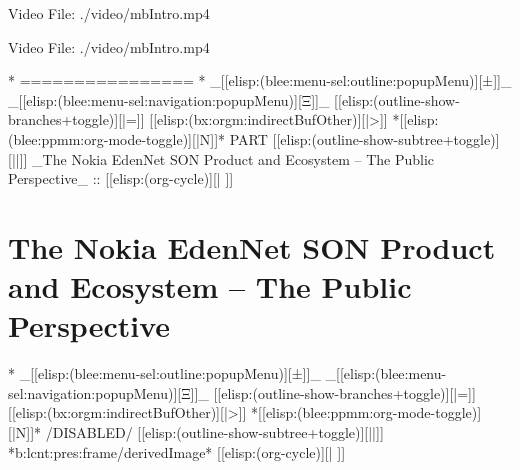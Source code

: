 \begin{whenOrg}
\begin{frame}[fragile,plain,label=thisIsMohsen]
\begin{presentationMode}
\begin{latexonly}
    \begin{center}
      Video File: ./video/mbIntro.mp4
    \end{center}
\end{latexonly}
\end{presentationMode}

\begin{articleMode}
\begin{latexonly}
    \begin{center}
      Video File: ./video/mbIntro.mp4
    \end{center}
\end{latexonly}
\end{articleMode}


\end{frame}


\begin{whenOrg}
*      ================
*  _[[elisp:(blee:menu-sel:outline:popupMenu)][±]]_ _[[elisp:(blee:menu-sel:navigation:popupMenu)][Ξ]]_ [[elisp:(outline-show-branches+toggle)][|=]] [[elisp:(bx:orgm:indirectBufOther)][|>]] *[[elisp:(blee:ppmm:org-mode-toggle)][|N]]*  PART       [[elisp:(outline-show-subtree+toggle)][||]]   _The Nokia EdenNet SON Product and Ecosystem -- The Public Perspective_ ::  [[elisp:(org-cycle)][| ]]
\end{whenOrg}

\newpage
\part{The Nokia EdenNet SON Product and Ecosystem -- The Public Perspective}

\begin{whenOrg}
*  _[[elisp:(blee:menu-sel:outline:popupMenu)][±]]_ _[[elisp:(blee:menu-sel:navigation:popupMenu)][Ξ]]_ [[elisp:(outline-show-branches+toggle)][|=]] [[elisp:(bx:orgm:indirectBufOther)][|>]] *[[elisp:(blee:ppmm:org-mode-toggle)][|N]]*  /DISABLED/   [[elisp:(outline-show-subtree+toggle)][||]] *b:lcnt:pres:frame/derivedImage*  [[elisp:(org-cycle)][| ]]\end{whenOrg}


\end{whenOrg}
